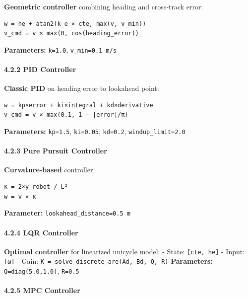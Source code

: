 \textbf{Geometric controller} combining heading and cross-track error:

\begin{verbatim}
w = he + atan2(k_e × cte, max(v, v_min))
v_cmd = v × max(0, cos(heading_error))
\end{verbatim}

\textbf{Parameters:} \texttt{k=1.0}, \texttt{v\_min=0.1\ m/s}

\hypertarget{pid-controller}{%
\paragraph{4.2.2 PID Controller}\label{pid-controller}}

\textbf{Classic PID} on heading error to lookahead point:

\begin{verbatim}
w = kp×error + ki×integral + kd×derivative
v_cmd = v × max(0.1, 1 − |error|/π)
\end{verbatim}

\textbf{Parameters:} \texttt{kp=1.5}, \texttt{ki=0.05}, \texttt{kd=0.2},
\texttt{windup\_limit=2.0}

\hypertarget{pure-pursuit-controller}{%
\paragraph{4.2.3 Pure Pursuit
Controller}\label{pure-pursuit-controller}}

\textbf{Curvature-based} controller:

\begin{verbatim}
κ = 2×y_robot / L²
w = v × κ
\end{verbatim}

\textbf{Parameter:} \texttt{lookahead\_distance=0.5\ m}

\hypertarget{lqr-controller}{%
\paragraph{4.2.4 LQR Controller}\label{lqr-controller}}

\textbf{Optimal controller} for linearized unicycle model: - State:
\texttt{{[}cte,\ he{]}} - Input: \texttt{{[}ω{]}} - Gain:
\texttt{K\ =\ solve\_discrete\_are(Ad,\ Bd,\ Q,\ R)}
\textbf{Parameters:} \texttt{Q=diag(5.0,1.0)}, \texttt{R=0.5}

\hypertarget{mpc-controller}{%
\paragraph{4.2.5 MPC Controller}\label{mpc-controller}}

